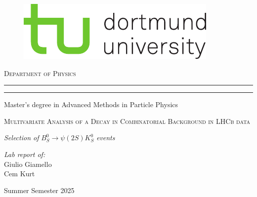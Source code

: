 \begin{titlepage}
	
	\begin{figure}[ht]
		\vspace{-0.5cm} %
		\begin{center}
			\includegraphics[scale=1.50]{tud_logos/logo_tud_english.pdf}
		\end{center}
	\end{figure}

    \vspace{15mm} %
	
	\begin{center}
		{{\large{\textsc{Department of Physics}}}}
		\rule[0.1cm]{\linewidth}{0.3mm} %
		\rule[0.5cm]{\linewidth}{0.3mm} %
		Master’s degree in Advanced Methods in Particle Physics
	\end{center}
	
	\vspace{25mm} %
	\begin{center}
		\begin{Large}
			\textsc{Multivariate Analysis of a Decay in Combinatorial Background in LHCb data}
		\end{Large}
        
        \vspace{5mm} %
        \textit{Selection of} $B^{0}_{S} \xrightarrow{} \psi(2S)K^{0}_{S}$ \textit{events}
	\end{center}
    
	\vspace{35mm} %
	\noindent
	\raggedleft
		{\large{\textit{Lab report of:}
        \\ Giulio Giamello
        \\Cem Kurt}}
	\vfill
	\vspace{15mm}
	\begin{center}
		{\large{Summer Semester 2025}}
	\end{center}
	\vspace{-2cm}
	
\end{titlepage}
